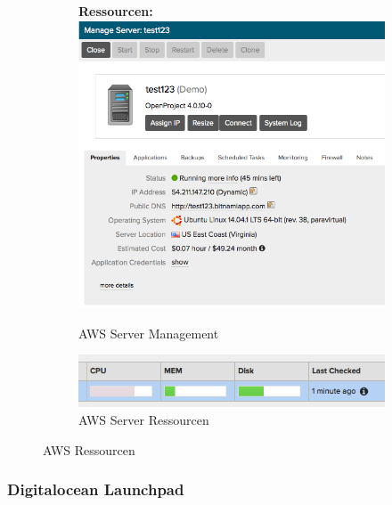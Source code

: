 \begin{figure}[!htbp]
 \centering
  \begin{subfigure}[b]{.49\textwidth}
\textbf{Ressourcen:}\\
\includegraphics[width=\textwidth]{./03_Analyse/03_Bitnami/images/aws_managment}
\caption{AWS Server Management}
\end{subfigure}
  \hfill
 \begin{subfigure}[b]{.49\textwidth}
\includegraphics[width=\textwidth]{./03_Analyse/03_Bitnami/images/aws_resrouces}
\caption{AWS Server Ressourcen}
\end{subfigure}
\caption{AWS Ressourcen}
\end{figure}

\newpage
\subsubsection{Digitalocean Launchpad\autocite{digitalocean}}

